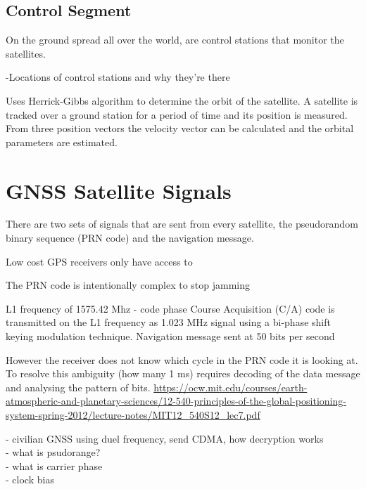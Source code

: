 \subsection{Control Segment}
On the ground spread all over the world, are control stations that monitor the satellites. 

-Locations of control stations and why they're there

Uses Herrick-Gibbs algorithm to determine the orbit of the satellite. A satellite is tracked over a ground station for a period of time and its position is measured. From three position vectors the velocity vector can be calculated and the orbital parameters are estimated. 


\section{GNSS Satellite Signals}
There are two sets of signals that are sent from every satellite, the pseudorandom binary sequence (PRN code) and the navigation message.

Low cost GPS receivers only have access to  \cite{GPSrec}

The PRN code is intentionally complex to stop jamming 

L1 frequency of 1575.42 Mhz  - code phase
Course Acquisition (C/A) code is transmitted on the L1 frequency as 1.023 MHz signal using a bi-phase shift keying modulation technique.
Navigation message sent at 50 bits per second  

However the receiver does not know which cycle in the PRN code it is looking at. To resolve this ambiguity (how many 1 ms) requires decoding of the data message and analysing the pattern of bits.
\url{https://ocw.mit.edu/courses/earth-atmospheric-and-planetary-sciences/12-540-principles-of-the-global-positioning-system-spring-2012/lecture-notes/MIT12_540S12_lec7.pdf}

- civilian GNSS using duel frequency, send CDMA, how decryption works\\
- what is psudorange?\\
- what is carrier phase\\
- clock bias\\



